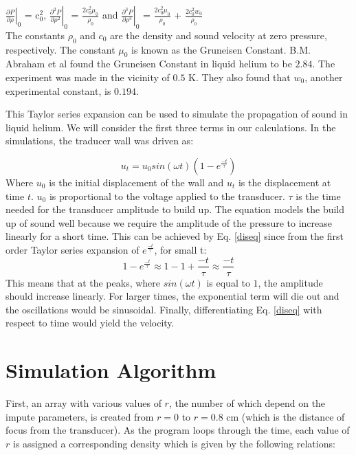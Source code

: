 $\left.\frac{\partial P}{\partial \rho}\right|_0$ = c$_0^2$, $\left.\frac{\partial^2 P}{\partial \rho^2}\right|_0$ = $\frac{2c_0^2\mu_0}{\rho_0}$ and $\left.\frac{\partial^3 P}{\partial \rho^3}\right|_0$ = $\frac{2c_0^2\mu_0}{\rho_0}$ + $\frac{2c_0^2w_0}{\rho_0}$\\

The constants $\rho_0$ and $c_0$ are the density and sound velocity at zero pressure, respectively. The constant $\mu_0$ is known as the Gruneisen Constant. B.M. Abraham et al \cite{PhysRevA.2.550.3} found the Gruneisen Constant in liquid helium to be $2.84$. The experiment was made in the vicinity of $0.5$ K. They also found that $w_0$, another experimental constant, is $0.194$.

This Taylor series expansion can be used to simulate the propagation of sound in liquid helium. We will consider the first three terms in our calculations. In the simulations, the traducer wall was driven as:

\begin{equation}\label{diseq}
u_t = u_0 sin(\omega t)(1-e^{\frac{-t}{\tau}})
\end{equation}
Where $u_0$ is the initial displacement of the wall and $u_t$ is the displacement at time $t$. $u_0$ is proportional to the voltage applied to the transducer. $\tau$ is the time needed for the transducer amplitude to build up. The equation models the build up of sound well because we require the amplitude of the pressure to increase linearly for a short time. This can be achieved by Eq. \ref{diseq} since from the first order Taylor series expansion of $e^{\frac{-t}{\tau}}$, for small t:
$$1-e^{\frac{-t}{\tau}} \approx 1 - 1 + \frac{-t}{\tau}  \approx \frac{-t}{\tau}$$
This means that at the peaks, where $sin(\omega t)$ is equal to $1$, the amplitude should increase linearly. For larger times, the exponential term will die out and the oscillations would be sinusoidal. Finally, differentiating Eq. \ref{diseq} with respect to time would yield the velocity. 

\section{Simulation Algorithm}
First, an array with various values of $r$, the number of which depend on the impute parameters, is created from $r = 0$ to $r = 0.8$ cm (which is the distance of focus from the transducer). As the program loops through the time, each value of $r$ is assigned a corresponding density which is given by the following relations:

